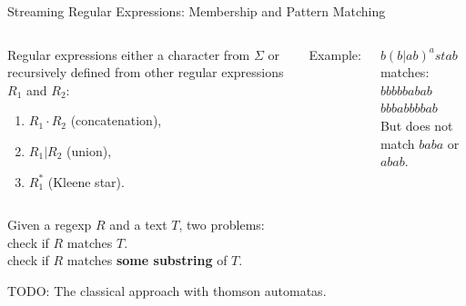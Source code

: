 \documentclass[aspectratio=169]{beamer}
\begin{document}
\begin{frame}{Streaming Regular Expressions: Membership and Pattern Matching}
    \begin{columns}
        \begin{block}{Regular expressions}
            either a character from $\Sigma$ or recursively defined from other regular expressions $R_1$ and $R_2$:
            \pause
            \begin{enumerate}
                \item $R_1 \cdot R_2$ (concatenation),
                \pause
                \item $R_1 | R_2$ (union),
                \pause
                \item $R_1^\ast$ (Kleene star).
            \end{enumerate}
            \pause
        \end{block}
        Example:
        \begin{center}
            $b(b|ab)^astab$ matches:\\
            \checkmark $bbbbbabab$ \\
            \checkmark $bbbabbbbab$\\
            But does not match $baba$ or $abab$.
        \end{center}
    \end{columns}    
    \pause
    \bigskip
    {
        Given a regexp $R$ and a text $T$, two problems:\\
         check if $R$ matches $T$.\\
         check if $R$ matches \textbf{some substring} of $T$.
    }
    \bigskip


    TODO: The classical approach with thomson automatas. 
\end{frame}
\end{document}

